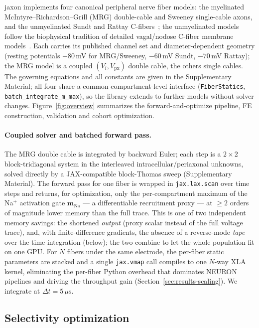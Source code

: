 jaxon implements four canonical peripheral nerve fiber models: the
myelinated McIntyre--Richardson--Grill (MRG) double-cable and Sweeney
single-cable axons, and the unmyelinated Sundt and Rattay
C-fibers~\cite{mcintyre2002,sweeney1987,sundt2015,rattay1989analysis};
the unmyelinated models follow the biophysical tradition of detailed
vagal/nodose C-fiber membrane models~\cite{schild1994}.
Each carries its published channel set and diameter-dependent geometry
(resting potentials $-80$\,mV for MRG/Sweeney, $-60$\,mV Sundt,
$-70$\,mV Rattay); the MRG model is a coupled $(V_i, V_{\mathrm{px}})$
double cable, the others single cables.  The governing equations and
all constants are given in the Supplementary Material; all four share
a common compartment-level interface (\texttt{FiberStatics},
\texttt{batch\_integrate\_m\_max}), so the library extends to further
models without solver changes.  Figure~\ref{fig:overview} summarizes
the forward-and-optimize pipeline, FE construction, validation and
cohort optimization.

\paragraph{Coupled solver and batched forward pass.}
The MRG double cable is integrated by backward Euler; each step is a
$2\times2$ block-tridiagonal system in the interleaved
intracellular/periaxonal unknowns, solved directly by a JAX-compatible
block-Thomas sweep (Supplementary Material).  The
forward pass for one fiber is wrapped in \texttt{jax.lax.scan} over
time steps and returns, for optimization, only the per-compartment
maximum of the Na$^+$ activation gate $\mathbf{m}_{\mathrm{Na}}$ --- a
differentiable recruitment proxy --- at $\ge\!2$ orders of magnitude
lower memory than the full trace.  This is one of two independent memory
savings: the shortened \emph{output} (proxy scalar instead of the full
voltage trace), and, with finite-difference gradients, the absence of a
reverse-mode \emph{tape} over the time integration (below); the two
combine to let the whole population fit on one GPU.  For $N$ fibers under the same
electrode, the per-fiber static parameters are stacked and a single
\texttt{jax.vmap} call compiles to one $N$-way XLA kernel, eliminating
the per-fiber Python overhead that dominates NEURON pipelines and
driving the throughput gain (Section~\ref{sec:results-scaling}).  We
integrate at $\Delta t = 5\,\mu\mathrm{s}$.

\subsection{Selectivity optimization}
\label{sec:methods-opt}

